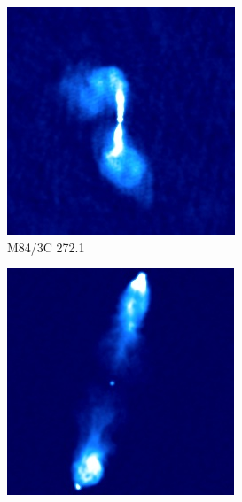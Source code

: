 \documentclass[11pt, a4paper]{book}
\begin{document}
        \begin{figure}
            \centering
            \begin{subfigure}{0.45\textwidth}
                \includegraphics[width=\textwidth]{images/3C_272-1.jpg}
                \caption{M84/3C 272.1}
                \label{fig:m84}
            \end{subfigure}
            \begin{subfigure}{0.45\textwidth}
                \includegraphics[width=\textwidth]{images/3C_223.jpg}

\end{subfigure}
\end{figure}
\end{document}
